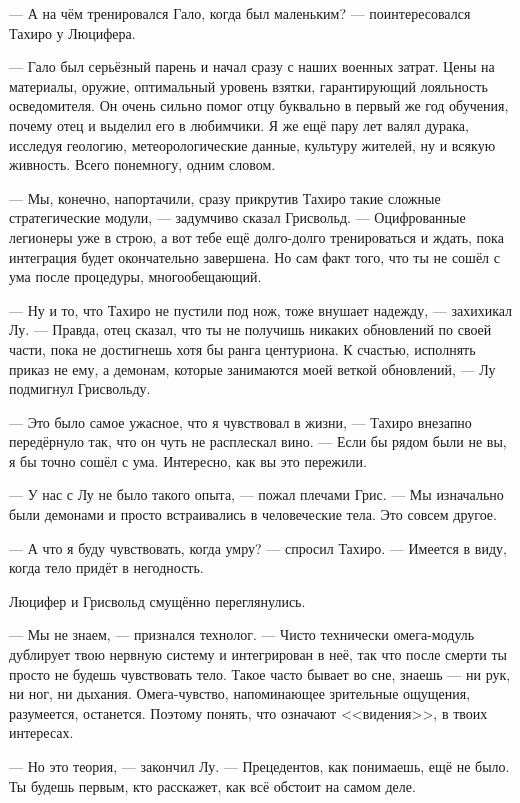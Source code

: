 --- А на чём тренировался Гало, когда был маленьким? --- поинтересовался Тахиро у Люцифера.

--- Гало был серьёзный парень и начал сразу с наших военных затрат.
Цены на материалы, оружие, оптимальный уровень взятки, гарантирующий лояльность осведомителя.
Он очень сильно помог отцу буквально в первый же год обучения, почему отец и выделил его в любимчики.
Я же ещё пару лет валял дурака, исследуя геологию, метеорологические данные, культуру жителей, ну и всякую живность.
Всего понемногу, одним словом.

--- Мы, конечно, напортачили, сразу прикрутив Тахиро такие сложные стратегические модули, --- задумчиво сказал Грисвольд.
--- Оцифрованные легионеры уже в строю, а вот тебе ещё долго-долго тренироваться и ждать, пока интеграция будет окончательно завершена.
Но сам факт того, что ты не сошёл с ума после процедуры, многообещающий.

--- Ну и то, что Тахиро не пустили под нож, тоже внушает надежду, --- захихикал Лу.
--- Правда, отец сказал, что ты не получишь никаких обновлений по своей части, пока не достигнешь хотя бы ранга центуриона.
К счастью, исполнять приказ не ему, а демонам, которые занимаются моей веткой обновлений, --- Лу подмигнул Грисвольду.

--- Это было самое ужасное, что я чувствовал в жизни, --- Тахиро внезапно передёрнуло так, что он чуть не расплескал вино.
--- Если бы рядом были не вы, я бы точно сошёл с ума.
Интересно, как вы это пережили.

--- У нас с Лу не было такого опыта, --- пожал плечами Грис.
--- Мы изначально были демонами и просто встраивались в человеческие тела.
Это совсем другое.

--- А что я буду чувствовать, когда умру? --- спросил Тахиро.
--- Имеется в виду, когда тело придёт в негодность.

Люцифер и Грисвольд смущённо переглянулись.

--- Мы не знаем, --- признался технолог.
--- Чисто технически омега-модуль дублирует твою нервную систему и интегрирован в неё, так что после смерти ты просто не будешь чувствовать тело.
Такое часто бывает во сне, знаешь --- ни рук, ни ног, ни дыхания.
Омега-чувство, напоминающее зрительные ощущения, разумеется, останется.
Поэтому понять, что означают <<видения>>, в твоих интересах.

--- Но это теория, --- закончил Лу.
--- Прецедентов, как понимаешь, ещё не было.
Ты будешь первым, кто расскажет, как всё обстоит на самом деле.

